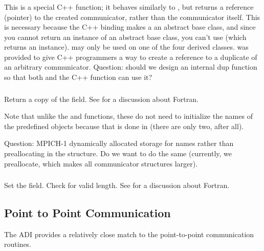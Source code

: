 \documentclass{article}
\begin{document}
\subsubsection{}
This is a special C++ function; it behaves similarly to
, but returns a reference (pointer) to the created
communicator, rather than the communicator itself.  This is necessary because
the C++ binding makes a  an abstract base class, and since
you cannot return an instance of an abstract base class, you can't use
 (which returns an instance).  
may only be used on one of the four derived classes.
 was provided to give C++ programmers a way to
create a reference to a duplicate of an arbitrary communicator.
Question: should we design an internal dup function so that both
 and the C++  function can use it?

\subsubsection{}
Return a copy of the  field.  
See  for a discussion about Fortran.

Note that unlike the  and
 functions, these do not need to initialize
the names of the predefined objects because that is done in
 (there are only two, after all).

Question: MPICH-1 dynamically allocated storage for names rather than
preallocating in the structure.  Do we want to do the same (currently,
we preallocate, which makes all communicator structures larger).

\subsubsection{}
Set the  field.  Check for valid length.
See  for a discussion about Fortran.

\subsection{Point to Point Communication}
\label{sec:pt-2-pt}

The ADI provides a relatively close match to the point-to-point
communication routines.  
\end{document}
